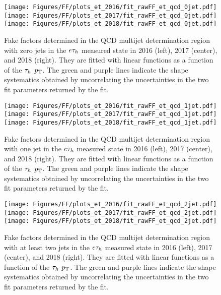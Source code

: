 \begin{figure}[ht!b]
\centering
\texttt{[image: Figures/FF/plots\_et\_2016/fit\_rawFF\_et\_qcd\_0jet.pdf]}
\texttt{[image: Figures/FF/plots\_et\_2017/fit\_rawFF\_et\_qcd\_0jet.pdf]}
\texttt{[image: Figures/FF/plots\_et\_2018/fit\_rawFF\_et\_qcd\_0jet.pdf]}\\
\caption{\label{fig:fit_raw_et_0jet_qcd} Fake factors determined in the QCD multijet determination region with zero jets in the $e\tau_h$ measured state in 2016 (left), 2017 (center), and 2018 (right). They are fitted with linear functions as a function of the $\tau_h$ $p_{\mathrm{T}}$. The green and purple lines indicate the shape systematics obtained by uncorrelating the uncertainties in the two fit parameters returned by the fit.  }
\end{figure}


\begin{figure}[ht!b]
\centering
\texttt{[image: Figures/FF/plots\_et\_2016/fit\_rawFF\_et\_qcd\_1jet.pdf]}
\texttt{[image: Figures/FF/plots\_et\_2017/fit\_rawFF\_et\_qcd\_1jet.pdf]}
\texttt{[image: Figures/FF/plots\_et\_2018/fit\_rawFF\_et\_qcd\_1jet.pdf]}\\
\caption{\label{fig:fit_raw_et_1jet_qcd} Fake factors determined in the QCD multijet determination region with one jet in the $e\tau_h$ measured state in 2016 (left), 2017 (center), and 2018 (right). They are fitted with linear functions as a function of the $\tau_h$ $p_{\mathrm{T}}$. The green and purple lines indicate the shape systematics obtained by uncorrelating the uncertainties in the two fit parameters returned by the fit.  }
\end{figure}

\begin{figure}[ht!b]
\centering
\texttt{[image: Figures/FF/plots\_et\_2016/fit\_rawFF\_et\_qcd\_2jet.pdf]}
\texttt{[image: Figures/FF/plots\_et\_2017/fit\_rawFF\_et\_qcd\_2jet.pdf]}
\texttt{[image: Figures/FF/plots\_et\_2018/fit\_rawFF\_et\_qcd\_2jet.pdf]}\\
\caption{\label{fig:fit_raw_et_2jet_qcd} Fake factors determined in the QCD multijet determination region with at least two jets in the $e\tau_h$ measured state in 2016 (left), 2017 (center), and 2018 (right). They are fitted with linear functions as a function of the $\tau_h$ $p_{\mathrm{T}}$. The green and purple lines indicate the shape systematics obtained by uncorrelating the uncertainties in the two fit parameters returned by the fit.  }
\end{figure}



